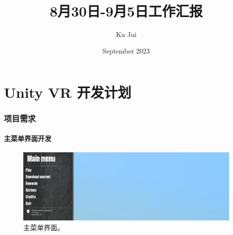 \documentclass[letterpaper,10pt]{article}
\begin{document}
	
	
	\title{\songti {}8月30日-9月5日工作汇报}
	\author{\textrm{Ku Jui}}
	\date{\textrm{September 2023}}
	\maketitle
	
	\renewcommand{\figurename}{Figure} %
	\renewcommand{\contentsname}{Contents}
	\renewcommand{\tablename}{Table}
	\tableofcontents  %
	
	\part{Unity VR 开发计划}

		\section{项目需求}
	
			\subsection{主菜单界面开发}
	
			\begin{figure}[htbp]
				\centering 
				\includegraphics[width=\columnwidth]{picture/Main menu}
				\caption{
					\label{fig: Main menu} 
					主菜单界面。
				}
			\end{figure}
			
\end{document}
